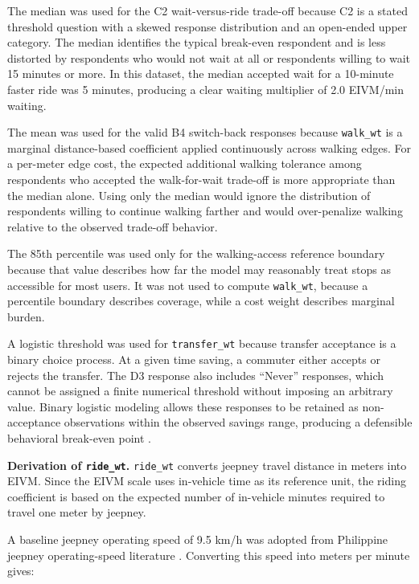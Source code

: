 {The median was used for the C2 wait-versus-ride trade-off because C2 is a stated threshold question with a skewed response distribution and an open-ended upper category. The median identifies the typical break-even respondent and is less distorted by respondents who would not wait at all or respondents willing to wait 15 minutes or more. In this dataset, the median accepted wait for a 10-minute faster ride was 5 minutes, producing a clear waiting multiplier of 2.0 \ac{EIVM}/min waiting.

The mean was used for the valid B4 switch-back responses because \texttt{walk\_wt} is a marginal distance-based coefficient applied continuously across walking edges. For a per-meter edge cost, the expected additional walking tolerance among respondents who accepted the walk-for-wait trade-off is more appropriate than the median alone. Using only the median would ignore the distribution of respondents willing to continue walking farther and would over-penalize walking relative to the observed trade-off behavior.

The 85th percentile was used only for the walking-access reference boundary because that value describes how far the model may reasonably treat stops as accessible for most users. It was not used to compute \texttt{walk\_wt}, because a percentile boundary describes coverage, while a cost weight describes marginal burden.

A logistic threshold was used for \texttt{transfer\_wt} because transfer acceptance is a binary choice process. At a given time saving, a commuter either accepts or rejects the transfer. The D3 response also includes ``Never'' responses, which cannot be assigned a finite numerical threshold without imposing an arbitrary value. Binary logistic modeling allows these responses to be retained as non-acceptance observations within the observed savings range, producing a defensible behavioral break-even point \citep{benakiva1985discrete,train2009discrete}.

\noindent\textbf{Derivation of \texttt{ride\_wt}.}
\texttt{ride\_wt} converts jeepney travel distance in meters into \ac{EIVM}. Since the \ac{EIVM} scale uses in-vehicle time as its reference unit, the riding coefficient is based on the expected number of in-vehicle minutes required to travel one meter by jeepney.

A baseline jeepney operating speed of 9.5 km/h was adopted from Philippine jeepney operating-speed literature \cite{ranosa2021}. Converting this speed into meters per minute gives:

}
